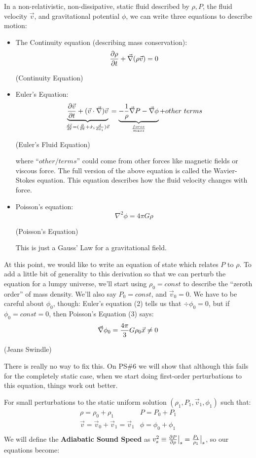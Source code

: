 \documentclass{article}
\def\inv#1{\frac{1}{ #1}}
\def\vv{{\vec v}}
\def\vv{{\vec v}}
\begin{document}
\def\eval#1{\big|_{#1}}
In a non-relativistic, non-dissipative, static fluid described by
$\rho, P$, the fluid velocity $\vec v$, and gravitational potential $\phi$,
we can write three equations to describe motion:
\begin{itemize}
\item The Continuity equation (describing mass conservation):
\def\div{{\vec\nabla}}
\def\vv{{\vec v}}
$${\partial\rho\over\partial t}+\div(\rho\vv)=0$$
\centerline{(Continuity Equation)}
\item Euler's Equation:
$$\underbrace{{\partial\vv\over\partial t}+(\vv\cdot\div)\vv}_{{d\vv\over
dt}=({\partial\over\partial t}+\dot x_i{d\over dx_i})\vv}
=\underbrace{-\inv{\rho}\div P-\div\phi}_{force\over mass}+other\ terms$$
\centerline{(Euler's Fluid Equation)}
where ``$other/ terms$'' could come from other forces like magnetic fields or 
viscous force.  The full version of the above equation is called the 
Wavier-Stokes equation.  This equation describes how the fluid velocity changes 
with force.
\item Poisson's equation:
$$\nabla^2\phi=4\pi G\rho$$
\centerline{(Poisson's Equation)}
This is just a Gauss' Law for a gravitational field.
\end{itemize}
At this point, we would like to write an equation of state which relates
$P$ to $\rho$.  To add a little bit of generality to this derivation
so that we can perturb the equation for a lumpy universe, we'll
start using $\rho_0=const$ to describe the ``zeroth order'' of mass density.
We'll also say $P_0=const$, and $\vv_0=0$.  We have to be careful about
$\phi_0$, though: Euler's equation (2) tells us that $\div\phi_0=0$,
but if $\phi_0=const=0$,  then Poisson's Equation (3) says:
$$\div\phi_0={4\pi\over3}G\rho_0\vec x\ne0$$
\centerline{(Jeans Swindle)}
There is really no way to fix this.  On PS\#6 we will show that although
this fails for the completely static case, when we start doing first-order
perturbations to this equation, things work out better.\par
For small perturbations to the static uniform solution $(\rho_1,P_1,\vv_1,
\phi_1)$ such that:
$$\begin{matrix} \rho=\rho_0+\rho_1&P=P_0+P_1\\
\vv=\vv_0+\vv_1=\vv_1&\phi=\phi_0+\phi_1\\\end{matrix}$$
We will define the {\bf Adiabatic Sound Speed} as $v_s^2\equiv{\partial P\over
\partial\rho}\eval{s}={P_1\over \rho_1}\eval{s}$, so our equations become:
\end{document}
